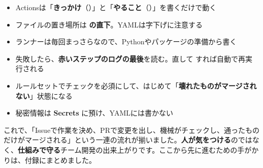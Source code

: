 \begin{itemize}[leftmargin=1.4em]
  \item Actionsは「\textbf{きっかけ}（）」と「\textbf{やること}（）」を書くだけで動く
  \item ファイルの置き場所は \textbf{ の直下}。YAMLは字下げに注意する
  \item ランナーは毎回まっさらなので、Pythonやパッケージの準備から書く
  \item 失敗したら、\textbf{赤いステップのログの最後}を読む。直して  すれば自動で再実行される
  \item ルールセットでチェックを必須にして、はじめて「\textbf{壊れたものがマージされない}」状態になる
  \item 秘密情報は \textbf{Secrets} に預け、YAMLには書かない
\end{itemize}

これで、「Issueで作業を決め、PRで変更を出し、機械がチェックし、通ったものだけがマージされる」という一連の流れが揃いました。\textbf{人が気をつける}のではなく、\textbf{仕組みで守る}チーム開発の出来上がりです。ここから先に進むための手がかりは、付録にまとめました。
